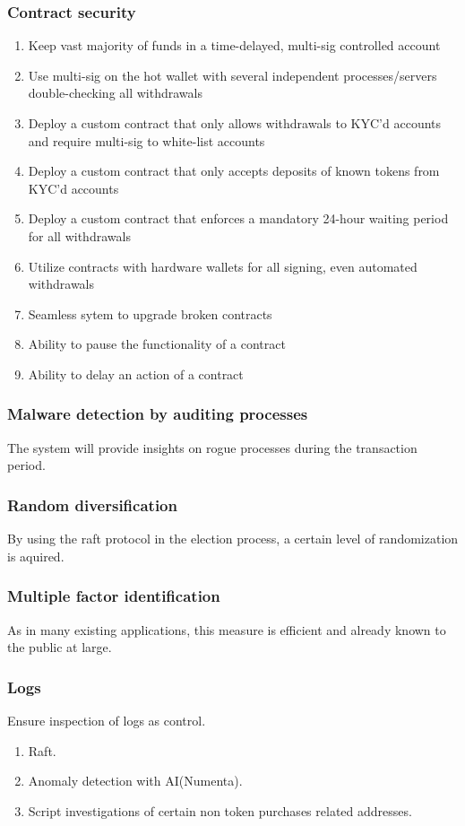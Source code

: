 \documentclass[]{article}
\begin{document}
		\subsubsection{Contract security}
		\begin{enumerate}
		\item Keep vast majority of funds in a time-delayed, multi-sig controlled account
		\item Use multi-sig on the hot wallet with several independent processes/servers double-checking all withdrawals
		\item Deploy a custom contract that only allows withdrawals to KYC'd accounts and require multi-sig to white-list accounts
		\item Deploy a custom contract that only accepts deposits of known tokens from KYC'd accounts
		\item Deploy a custom contract that enforces a mandatory 24-hour waiting period for all withdrawals
		\item Utilize contracts with hardware wallets for all signing, even automated withdrawals
		\item Seamless sytem to upgrade broken contracts
		\item Ability to pause the functionality of a contract 
		\item Ability to delay an action of a contract	
		\end{enumerate}
		\subsubsection{Malware detection by auditing processes}
		The system will provide insights on rogue processes during the transaction period. 
		\subsubsection{Random diversification}
		By using the raft protocol in the election process, a certain level of randomization is aquired.
		\subsubsection{Multiple factor identification}
		As in many existing applications, this measure is efficient and already known to the public at large.
		\subsubsection {Logs}
			Ensure inspection of logs as control.
			\begin{enumerate}
				\item Raft.
				\item Anomaly detection with AI(Numenta).
				\item Script investigations of certain non token purchases related addresses.
			\end{enumerate}
\end{document}
